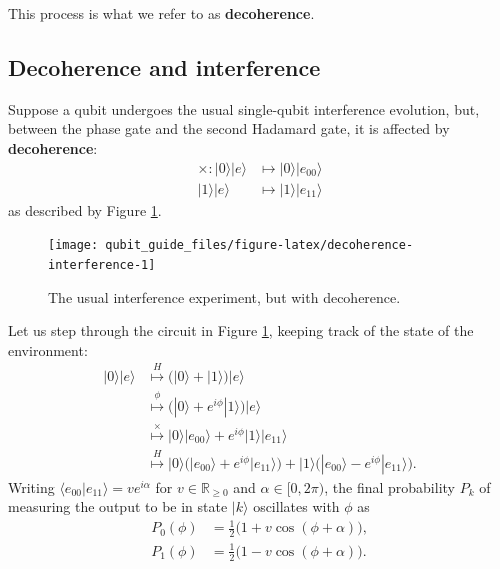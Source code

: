 \documentclass[fleqn,a4paper]{article}
\newenvironment{idea}{\everypar{\setlength{\parindent}{1.5em}}}{}
\theoremstyle{definition}
\theoremstyle{definition}
\theoremstyle{definition}
\theoremstyle{definition}
\theoremstyle{remark}
\begin{document}
\begin{idea}
This process is what we refer to as \textbf{decoherence}.

\end{idea}

\hypertarget{decoherence-and-interference}{%
\subsection{Decoherence and interference}\label{decoherence-and-interference}}

Suppose a qubit undergoes the usual single-qubit interference evolution, but, between the phase gate and the second Hadamard gate, it is affected by \textbf{decoherence}:
\[
  \begin{aligned}
    \times\colon
    |0\rangle|e\rangle
    &\longmapsto |0\rangle|e_{00}\rangle
  \\|1\rangle|e\rangle
    &\longmapsto |1\rangle|e_{11}\rangle
  \end{aligned}
\]
as described by Figure \ref{fig:decoherence-interference}.

\begin{figure}[H]

{\centering \texttt{[image: qubit\_guide\_files/figure-latex/decoherence-interference-1]} 

}

\caption{The usual interference experiment, but with decoherence.}\label{fig:decoherence-interference}
\end{figure}

Let us step through the circuit in Figure \ref{fig:decoherence-interference}, keeping track of the state of the environment:
\[
  \begin{aligned}
    |0\rangle|e\rangle
    & \overset{H}{\longmapsto} \Big( |0\rangle + |1\rangle \Big) |e\rangle
  \\& \overset{\phi}{\longmapsto} \Big( |0\rangle + e^{i\phi}|1\rangle \Big) |e\rangle
  \\& \overset{\times}{\longmapsto} |0\rangle|e_{00}\rangle + e^{i\phi}|1\rangle|e_{11}\rangle
  \\& \overset{H}{\longmapsto} |0\rangle\Big( |e_{00}\rangle + e^{i\phi}|e_{11}\rangle \Big) + |1\rangle\Big( |e_{00}\rangle - e^{i\phi}|e_{11}\rangle \Big).
  \end{aligned}
\]
Writing \(\langle e_{00}|e_{11}\rangle=ve^{i\alpha}\) for \(v\in\mathbb{R}_{\geqslant 0}\) and \(\alpha\in[0,2\pi)\), the final probability \(P_k\) of measuring the output to be in state \(|k\rangle\) oscillates with \(\phi\) as
\[
  \begin{aligned}
    P_{0}(\phi) &= \frac{1}{2}\big(1 + v\cos(\phi + \alpha)\big),
  \\P_{1}(\phi) &= \frac{1}{2}\big(1 - v\cos(\phi + \alpha)\big).
  \end{aligned}
\]
\end{document}
